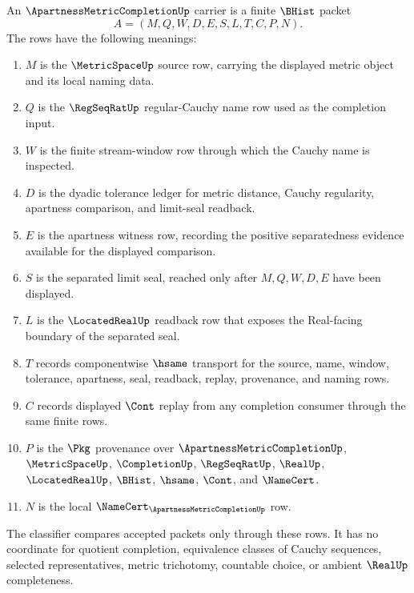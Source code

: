 \begin{definition}
\label{def:apartness-metric-completion-carrier}
An $\ApartnessMetricCompletionUp$ carrier is a finite $\BHist$ packet
$$
A=(M,Q,W,D,E,S,L,T,C,P,N).
$$
The rows have the following meanings:
\begin{enumerate}
\item $M$ is the $\MetricSpaceUp$ source row, carrying the displayed metric object and its local naming data.
\item $Q$ is the $\RegSeqRatUp$ regular-Cauchy name row used as the completion input.
\item $W$ is the finite stream-window row through which the Cauchy name is inspected.
\item $D$ is the dyadic tolerance ledger for metric distance, Cauchy regularity, apartness comparison, and limit-seal readback.
\item $E$ is the apartness witness row, recording the positive separatedness evidence available for the displayed comparison.
\item $S$ is the separated limit seal, reached only after $M,Q,W,D,E$ have been displayed.
\item $L$ is the $\LocatedRealUp$ readback row that exposes the Real-facing boundary of the separated seal.
\item $T$ records componentwise $\hsame$ transport for the source, name, window, tolerance, apartness, seal, readback, replay, provenance, and naming rows.
\item $C$ records displayed $\Cont$ replay from any completion consumer through the same finite rows.
\item $P$ is the $\Pkg$ provenance over $\ApartnessMetricCompletionUp$, $\MetricSpaceUp$, $\CompletionUp$, $\RegSeqRatUp$, $\RealUp$, $\LocatedRealUp$, $\BHist$, $\hsame$, $\Cont$, and $\NameCert$.
\item $N$ is the local $\NameCert_{\ApartnessMetricCompletionUp}$ row.
\end{enumerate}
The classifier compares accepted packets only through these rows. It has no coordinate for quotient completion, equivalence classes of Cauchy sequences, selected representatives, metric trichotomy, countable choice, or ambient $\RealUp$ completeness.
\end{definition}

